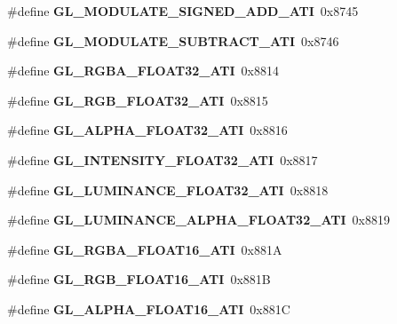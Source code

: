 \begin{DoxyCompactItemize}
\item 
\#define {\bfseries G\+L\+\_\+\+M\+O\+D\+U\+L\+A\+T\+E\+\_\+\+S\+I\+G\+N\+E\+D\+\_\+\+A\+D\+D\+\_\+\+A\+T\+I}~0x8745\label{_s_d_l__opengl_8h_ae1cccc0d5f7edcae559dea44117aed4a}

\item 
\#define {\bfseries G\+L\+\_\+\+M\+O\+D\+U\+L\+A\+T\+E\+\_\+\+S\+U\+B\+T\+R\+A\+C\+T\+\_\+\+A\+T\+I}~0x8746\label{_s_d_l__opengl_8h_a95563a11efaec5e9f54c8402423951be}

\item 
\#define {\bfseries G\+L\+\_\+\+R\+G\+B\+A\+\_\+\+F\+L\+O\+A\+T32\+\_\+\+A\+T\+I}~0x8814\label{_s_d_l__opengl_8h_ac7e134b342b372a4b9e25815f8b9e7bd}

\item 
\#define {\bfseries G\+L\+\_\+\+R\+G\+B\+\_\+\+F\+L\+O\+A\+T32\+\_\+\+A\+T\+I}~0x8815\label{_s_d_l__opengl_8h_a182d2ed5e359b77f1e661ad2332a1c84}

\item 
\#define {\bfseries G\+L\+\_\+\+A\+L\+P\+H\+A\+\_\+\+F\+L\+O\+A\+T32\+\_\+\+A\+T\+I}~0x8816\label{_s_d_l__opengl_8h_a005c6e888c1db7ce0421e0cc882d2bb9}

\item 
\#define {\bfseries G\+L\+\_\+\+I\+N\+T\+E\+N\+S\+I\+T\+Y\+\_\+\+F\+L\+O\+A\+T32\+\_\+\+A\+T\+I}~0x8817\label{_s_d_l__opengl_8h_a717b4d6603b9e8ca2015ae96d071494e}

\item 
\#define {\bfseries G\+L\+\_\+\+L\+U\+M\+I\+N\+A\+N\+C\+E\+\_\+\+F\+L\+O\+A\+T32\+\_\+\+A\+T\+I}~0x8818\label{_s_d_l__opengl_8h_a9aa646407bd99059ebd561b994e3e49a}

\item 
\#define {\bfseries G\+L\+\_\+\+L\+U\+M\+I\+N\+A\+N\+C\+E\+\_\+\+A\+L\+P\+H\+A\+\_\+\+F\+L\+O\+A\+T32\+\_\+\+A\+T\+I}~0x8819\label{_s_d_l__opengl_8h_a8cb3cb4e833a7b94d5bff965ecb21288}

\item 
\#define {\bfseries G\+L\+\_\+\+R\+G\+B\+A\+\_\+\+F\+L\+O\+A\+T16\+\_\+\+A\+T\+I}~0x881\+A\label{_s_d_l__opengl_8h_a9a4db55ec2c8a231084bd03a4de05bcb}

\item 
\#define {\bfseries G\+L\+\_\+\+R\+G\+B\+\_\+\+F\+L\+O\+A\+T16\+\_\+\+A\+T\+I}~0x881\+B\label{_s_d_l__opengl_8h_a1930d98e479ef7f743d2d877727706e2}

\item 
\#define {\bfseries G\+L\+\_\+\+A\+L\+P\+H\+A\+\_\+\+F\+L\+O\+A\+T16\+\_\+\+A\+T\+I}~0x881\+C\label{_s_d_l__opengl_8h_a700db85f4b8bdc642c957ad06ae0bde9}


\end{DoxyCompactItemize}

